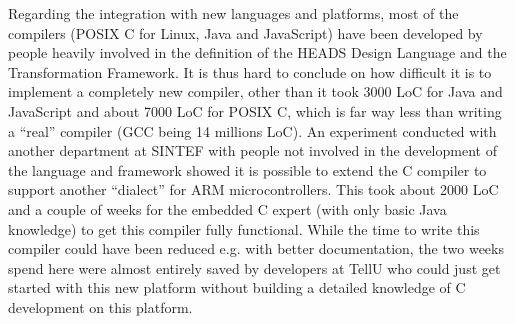 Regarding the integration with new languages and platforms, most of the compilers (POSIX C for Linux, Java and JavaScript) have been developed by people heavily involved in the definition of the HEADS Design Language and the Transformation Framework. It is thus hard to conclude on how difficult it is to implement a completely new compiler, other than it took 3000 LoC for Java and JavaScript and about 7000 LoC for POSIX C, which is far way less than writing a ``real'' compiler (GCC being 14 millions LoC). An experiment conducted with another department at SINTEF with people not involved in the development of the language and framework showed it is possible to extend the C compiler to support another ``dialect'' for ARM microcontrollers. This took about 2000 LoC and a couple of weeks for the embedded C expert (with only basic Java knowledge) to get this compiler fully functional. While the time to write this compiler could have been reduced e.g. with better documentation, the two weeks spend here were almost entirely saved by developers at TellU who could just get started with this new platform without building a detailed knowledge of C development on this platform.